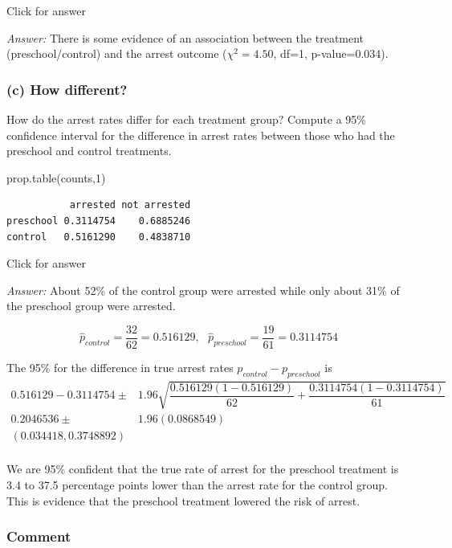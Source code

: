 \documentclass[
]{book}
\newenvironment{Shaded}{\begin{snugshade}}{\end{snugshade}}
\newcommand{\DecValTok}[1]{\textcolor[rgb]{0.00,0.00,0.81}{#1}}
\newcommand{\FunctionTok}[1]{\textcolor[rgb]{0.00,0.00,0.00}{#1}}
\newcommand{\NormalTok}[1]{#1}
\begin{document}
Click for answer

\emph{Answer:} There is some evidence of an association between the treatment (preschool/control) and the arrest outcome (\(\chi^2 = 4.50\), df=1, p-value=0.034).

\hypertarget{c-how-different}{%
\subsubsection{(c) How different?}\label{c-how-different}}

How do the arrest rates differ for each treatment group? Compute a 95\% confidence interval for the difference in arrest rates between those who had the preschool and control treatments.

\begin{Shaded}
\begin{Highlighting}[]
\FunctionTok{prop.table}\NormalTok{(counts,}\DecValTok{1}\NormalTok{)}
\end{Highlighting}
\end{Shaded}

\begin{verbatim}
           arrested not arrested
preschool 0.3114754    0.6885246
control   0.5161290    0.4838710
\end{verbatim}

Click for answer

\emph{Answer:} About 52\% of the control group were arrested while only about 31\% of the preschool group were arrested.

\[
\hat{p}_{control} = \dfrac{32}{62} = 0.516129, \ \ \ \hat{p}_{preschool} = \dfrac{19}{61} = 0.3114754
\]

The 95\% for the difference in true arrest rates \(p_{control} - p_{preschool}\) is
\begin{align*}
0.516129 - 0.3114754 \pm & 1.96 \sqrt{\dfrac{0.516129(1-0.516129)}{62} + \dfrac{0.3114754(1-0.3114754)}{61}} \\
0.2046536 \pm & 1.96(0.0868549) \\
(0.034418, 0.3748892) \\
\end{align*}

We are 95\% confident that the true rate of arrest for the preschool treatment is 3.4 to 37.5 percentage points lower than the arrest rate for the control group. This is evidence that the preschool treatment lowered the risk of arrest.

\hypertarget{comment}{%
\subsubsection{Comment}\label{comment}}
\end{document}
